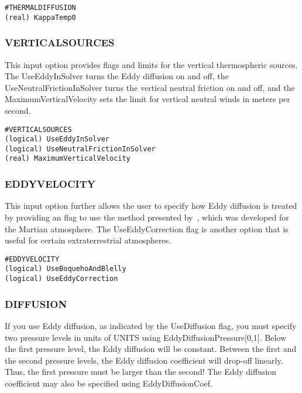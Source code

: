 \begin{verbatim}
#THERMALDIFFUSION
(real) KappaTemp0
\end{verbatim}

\subsubsection{VERTICALSOURCES}
\label{verticalsources.sec}

This input option provides flags and limits for the vertical thermospheric sources.  The UseEddyInSolver turns the Eddy diffusion on and off, the UseNeutralFrictionInSolver turns the vertical neutral friction on and off, and the MaximumVerticalVelocity sets the limit for vertical neutral winds in meters per second.

\begin{verbatim}
#VERTICALSOURCES
(logical) UseEddyInSolver             
(logical) UseNeutralFrictionInSolver  
(real) MaximumVerticalVelocity    
\end{verbatim}

\subsubsection{EDDYVELOCITY}
\label{eddyvelocity.sec}

This input option further allows the user to specify how Eddy diffusion is treated by providing an flag to use the method presented by~\citet{Boqueho:2005aa}, which was developed for the Martian atmosphere.  The UseEddyCorrection flag is another option that is useful for certain extraterrestrial atmospheres.

\begin{verbatim}
#EDDYVELOCITY
(logical) UseBoquehoAndBlelly 
(logical) UseEddyCorrection
\end{verbatim}

\subsubsection{DIFFUSION}
\label{diffusion.sec}

If you use Eddy diffusion, as indicated by the UseDiffusion flag, you must specify two pressure
levels in units of UNITS using EddyDiffusionPressure[0,1].  Below the first pressure level, the Eddy diffusion will be constant.  Between the first and the second pressure levels, the Eddy diffusion coefficient will drop-off linearly.  Thus, the first pressure must be larger than the second!  The Eddy diffusion coefficient may also be specified using EddyDiffusionCoef.

